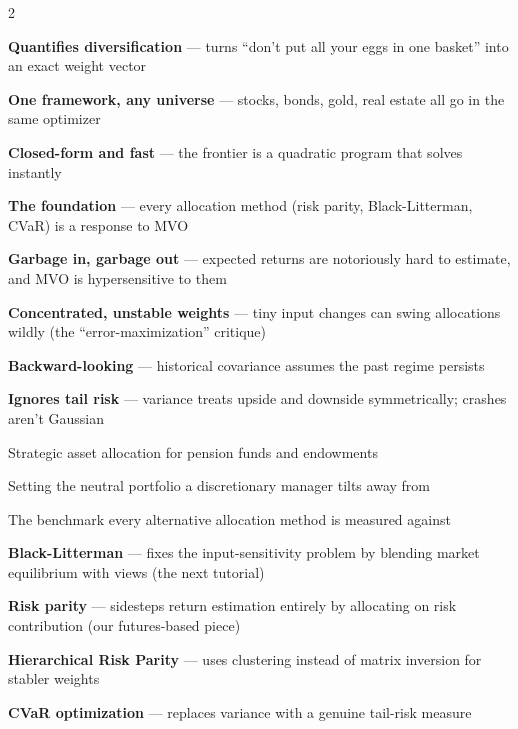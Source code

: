 \documentclass{pyportfolios-note}
\begin{document}
\begin{multicols}{2}
\begin{notebullets}
\item \textbf{Quantifies diversification} — turns ``don't put all your eggs in
      one basket'' into an exact weight vector
\item \textbf{One framework, any universe} — stocks, bonds, gold, real estate
      all go in the same optimizer
\item \textbf{Closed-form and fast} — the frontier is a quadratic program that
      solves instantly
\item \textbf{The foundation} — every allocation method (risk parity,
      Black-Litterman, CVaR) is a response to MVO
\end{notebullets}

\begin{notebullets}
\item \textbf{Garbage in, garbage out} — expected returns are notoriously hard
      to estimate, and MVO is hypersensitive to them
\item \textbf{Concentrated, unstable weights} — tiny input changes can swing
      allocations wildly (the ``error-maximization'' critique)
\item \textbf{Backward-looking} — historical covariance assumes the past regime
      persists
\item \textbf{Ignores tail risk} — variance treats upside and downside
      symmetrically; crashes aren't Gaussian
\end{notebullets}

\begin{notebullets}
\item Strategic asset allocation for pension funds and endowments
\item Setting the neutral portfolio a discretionary manager tilts away from
\item The benchmark every alternative allocation method is measured against
\end{notebullets}

\begin{notebullets}
\item \textbf{Black-Litterman} — fixes the input-sensitivity problem by blending
      market equilibrium with views (the next tutorial)
\item \textbf{Risk parity} — sidesteps return estimation entirely by allocating
      on risk contribution (our futures-based piece)
\item \textbf{Hierarchical Risk Parity} — uses clustering instead of matrix
      inversion for stabler weights
\item \textbf{CVaR optimization} — replaces variance with a genuine tail-risk
      measure
\end{notebullets}
\end{multicols}
\end{document}
